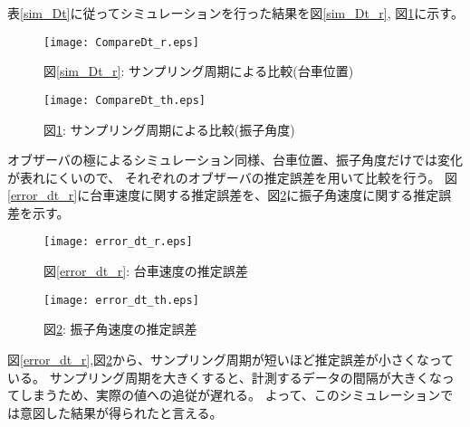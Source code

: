 表\ref{sim_Dt}に従ってシミュレーションを行った結果を図\ref{sim_Dt_r}, 図\ref{sim_Dt_th}に示す。

\begin{figure}[htbp]
    \begin{minipage}{0.5\hsize}
        \begin{center}
            \texttt{[image: CompareDt\_r.eps]}
            \caption{図\ref{sim_Dt_r}: サンプリング周期による比較(台車位置)}
            \label{sim_Dt_r}
        \end{center}
    \end{minipage}
    \begin{minipage}{0.5\hsize}
        \begin{center}
            \texttt{[image: CompareDt\_th.eps]}
            \caption{図\ref{sim_Dt_th}: サンプリング周期による比較(振子角度)}
            \label{sim_Dt_th}
        \end{center}
    \end{minipage}
\end{figure}

オブザーバの極によるシミュレーション同様、台車位置、振子角度だけでは変化が表れにくいので、
それぞれのオブザーバの推定誤差を用いて比較を行う。
図\ref{error_dt_r}に台車速度に関する推定誤差を、図\ref{error_dt_th}に振子角速度に関する推定誤差を示す。

\begin{figure}[htbp]
    \begin{minipage}{0.5\hsize}
        \begin{center}
            \texttt{[image: error\_dt\_r.eps]}
            \caption{図\ref{error_dt_r}: 台車速度の推定誤差}
            \label{error_dt_r}
        \end{center}
    \end{minipage}
    \begin{minipage}{0.5\hsize}
        \begin{center}
            \texttt{[image: error\_dt\_th.eps]}
            \caption{図\ref{error_dt_th}: 振子角速度の推定誤差}
            \label{error_dt_th}
        \end{center}
    \end{minipage}
\end{figure}

図\ref{error_dt_r},図\ref{error_dt_th}から、サンプリング周期が短いほど推定誤差が小さくなっている。
サンプリング周期を大きくすると、計測するデータの間隔が大きくなってしまうため、実際の値への追従が遅れる。
よって、このシミュレーションでは意図した結果が得られたと言える。


